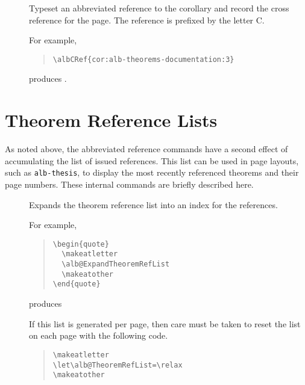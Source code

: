\documentclass[11pt,a4paper,oneside,titlepage]{alb-latex}
\begin{document}
\begin{description}
\item[] Typeset an abbreviated
  reference to the  corollary and record the cross
  reference for the page.  The reference is prefixed by the letter C.

  For example,
  \begin{quote}
\begin{verbatim}
\albCRef{cor:alb-theorems-documentation:3}
\end{verbatim}
  \end{quote}
  produces .
\end{description}




\section{Theorem Reference Lists}
\label{sec:alb-theorems-documentation:theorem-refer-lists}

As noted above, the abbreviated reference commands have a second effect
of accumulating the list of issued references.  This list can be used in
page layouts, such as \texttt{alb-thesis}, to display the most recently
referenced theorems and their page numbers.  These internal commands are
briefly described here.

\begin{description}
\item[] Expands the theorem
  reference list into an index for the references.

  For example,
  \begin{quote}
\begin{verbatim}
\begin{quote}
  \makeatletter
  \alb@ExpandTheoremRefList
  \makeatother
\end{quote}
\end{verbatim}
  \end{quote}
  produces
  \begin{quote}
    \makeatletter%
    \alb@ExpandTheoremRefList%
    \makeatother%
  \end{quote}

  If this list is generated per page, then care must be taken to reset
  the list on each page with the following code.
  \begin{quote}
\begin{verbatim}
\makeatletter
\let\alb@TheoremRefList=\relax
\makeatother
\end{verbatim}
  \end{quote}
\end{description}
\end{document}
